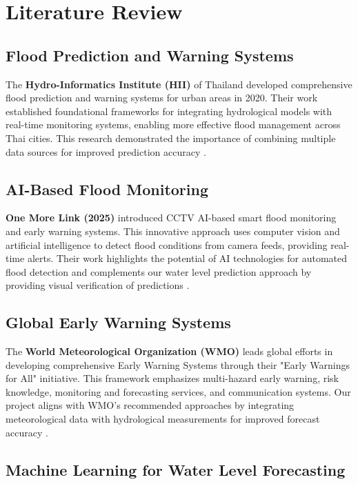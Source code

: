 \setlength{\footskip}{8mm}

\chapter{Literature Review}
\label{ch:literature-review}

\section{Flood Prediction and Warning Systems}

The \textbf{Hydro-Informatics Institute (HII)} of Thailand developed comprehensive flood prediction and warning systems for urban areas in 2020. Their work established foundational frameworks for integrating hydrological models with real-time monitoring systems, enabling more effective flood management across Thai cities. This research demonstrated the importance of combining multiple data sources for improved prediction accuracy \cite{hii2024flood}.

\section{AI-Based Flood Monitoring}

\textbf{One More Link (2025)} introduced CCTV AI-based smart flood monitoring and early warning systems. This innovative approach uses computer vision and artificial intelligence to detect flood conditions from camera feeds, providing real-time alerts. Their work highlights the potential of AI technologies for automated flood detection and complements our water level prediction approach by providing visual verification of predictions \cite{onemorelink2025cctv}.

\section{Global Early Warning Systems}

The \textbf{World Meteorological Organization (WMO)} leads global efforts in developing comprehensive Early Warning Systems through their "Early Warnings for All" initiative. This framework emphasizes multi-hazard early warning, risk knowledge, monitoring and forecasting services, and communication systems. Our project aligns with WMO's recommended approaches by integrating meteorological data with hydrological measurements for improved forecast accuracy \cite{wmo2024ews}.

\section{Machine Learning for Water Level Forecasting}

